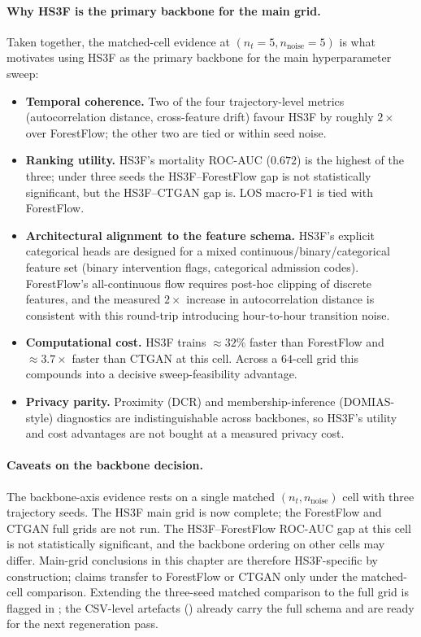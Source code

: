 \paragraph{Why HS3F is the primary backbone for the main grid.}
Taken together, the matched-cell evidence at $(n_t{=}5, n_{\text{noise}}{=}5)$ is what motivates using HS3F as the primary backbone for the main hyperparameter sweep:
\begin{itemize}\tightlist
    \item \textbf{Temporal coherence.} Two of the four trajectory-level metrics (autocorrelation distance, cross-feature drift) favour HS3F by roughly $2\times$ over ForestFlow; the other two are tied or within seed noise.
    \item \textbf{Ranking utility.} HS3F's mortality ROC-AUC ($0.672$) is the highest of the three; under three seeds the HS3F--ForestFlow gap is not statistically significant, but the HS3F--CTGAN gap is. LOS macro-F1 is tied with ForestFlow.
    \item \textbf{Architectural alignment to the feature schema.} HS3F's explicit categorical heads are designed for a mixed continuous/binary/categorical feature set (binary intervention flags, categorical admission codes). ForestFlow's all-continuous flow requires post-hoc clipping of discrete features, and the measured $2\times$ increase in autocorrelation distance is consistent with this round-trip introducing hour-to-hour transition noise.
    \item \textbf{Computational cost.} HS3F trains $\approx 32\%$ faster than ForestFlow and $\approx 3.7\times$ faster than CTGAN at this cell. Across a $64$-cell grid this compounds into a decisive sweep-feasibility advantage.
    \item \textbf{Privacy parity.} Proximity (DCR) and membership-inference (DOMIAS-style) diagnostics are indistinguishable across backbones, so HS3F's utility and cost advantages are not bought at a measured privacy cost.
\end{itemize}

\paragraph{Caveats on the backbone decision.}
The backbone-axis evidence rests on a single matched $(n_t, n_{\text{noise}})$ cell with three trajectory seeds. The HS3F main grid is now complete; the ForestFlow and CTGAN full grids are not run. The HS3F--ForestFlow ROC-AUC gap at this cell is not statistically significant, and the backbone ordering on other cells may differ. Main-grid conclusions in this chapter are therefore HS3F-specific by construction; claims transfer to ForestFlow or CTGAN only under the matched-cell comparison. Extending the three-seed matched comparison to the full grid is flagged in ; the CSV-level artefacts () already carry the full schema and are ready for the next regeneration pass.

